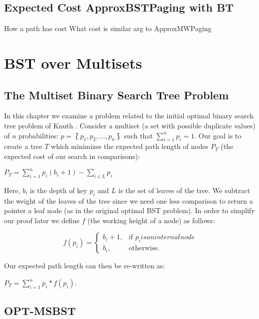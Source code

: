 \documentclass[letterpaper,12pt,titlepage,oneside,final]{book}
\theoremstyle{plain}
\begin{document}
\section{Expected Cost ApproxBSTPaging with BT}
How a path has cost
What cost is
similar arg to ApproxMWPaging

\chapter{BST over Multisets}\label{BST over Multisets}

\section{The Multiset Binary Search Tree Problem}\label{The Multiset Binary Search Tree Problem}

In this chapter we examine a problem related to the initial optimal binary search tree problem of Knuth \cite{knuth1971optimum}. Consider a multiset (a set with possible duplicate values) of $n$ probabilities: $p = \lbag p_1, p_2, ..., p_n \rbag$ such that $\sum\limits_{i=1}^n p_i = 1$. Our goal is to create a tree $T$ which minimizes the expected path length of nodes $P_T$ (the expected cost of our search in comparisons):
\begin{center}
$P_T = \sum_{i=1}^{n} p_i(b_i+1) - \sum_{i \in L}p_i$
\end{center}
Here, $b_i$ is the depth of key $p_i$ and $L$ is the set of leaves of the tree. We subtract the weight of the leaves of the tree since we need one less comparison to return a pointer a leaf node (as in the original optimal BST problem). In order to simplify our proof later we define $f$ (the working height of a node) as follows:
\begin{center}
\[
    f(p_i)= 
\begin{cases}
    b_i+1,& \text{if } p_i is an internal node\\
    b_i,              & \text{otherwise}.
\end{cases}
\]
\end{center}
Our expected path length can then be re-written as:
\begin{center}
$P_T = \sum_{i=1}^{n} p_i*f(p_i)$.
\end{center}

\section{OPT-MSBST}\label{OPT-MSBST}
\end{document}
